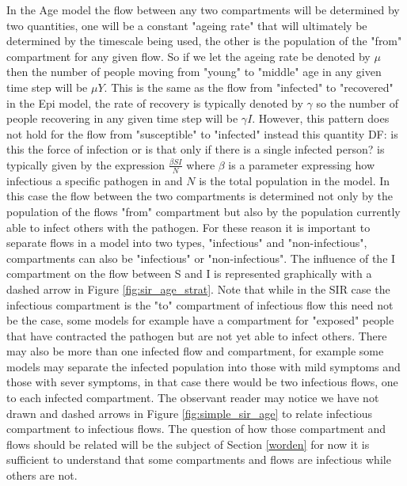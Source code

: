 \documentclass[pdflatex,sn-basic]{sn-jnl}%
\theoremstyle{definition}
\newcommand{\df}[1]{{\color{orange} DF: #1}}
\begin{document}
In the Age model the flow between any two compartments will be determined by two quantities, one will be a constant "ageing rate" that will ultimately be determined by the timescale being used, the other is the population of the "from" compartment for any given flow. So if we let the ageing rate be denoted by $\mu$ then the number of people moving from "young" to "middle" age in any given time step will be $\mu Y$. This is the same as the flow from "infected" to "recovered" in the Epi model, the rate of recovery is typically denoted by $\gamma$ so the number of people recovering in any given time step will be $\gamma I$. However, this pattern does not hold for the flow from "susceptible" to "infected" instead this quantity \df{is this the force of infection or is that only if there is a single infected person?} is typically given by the expression $\frac{\beta S I}{N}$ where $\beta$ is a parameter expressing how infectious a specific pathogen in and $N$ is the total population in the model. In this case the flow between the two compartments is determined not only by the population of the flows "from" compartment but also by the population currently able to infect others with the pathogen. For these reason it is important to separate flows in a model into two types, "infectious" and "non-infectious", compartments can also be "infectious" or "non-infectious". The influence of the I compartment on the flow between S and I is represented graphically with a dashed arrow in Figure \ref{fig:sir_age_strat}. Note that while in the SIR case the infectious compartment is the "to" compartment of infectious flow this need not be the case, some models for example have a compartment for "exposed" people that have contracted the pathogen but are not yet able to infect others. There may also be more than one infected flow and compartment, for example some models may separate the infected population into those with mild symptoms and those with sever symptoms, in that case there would be two infectious flows, one to each infected compartment. The observant reader may notice we have not drawn and dashed arrows in Figure \ref{fig:simple_sir_age} to relate infectious compartment to infectious flows. The question of how those compartment and flows should be related will be the subject of Section \ref{worden} for now it is sufficient to understand that some compartments and flows are infectious while others are not.
\end{document}
